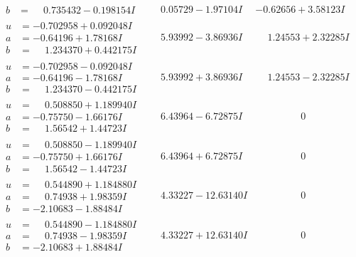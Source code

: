 \documentclass[1p]{elsarticle_modified}
\theoremstyle{definition}
\begin{document}
$$\begin{array}{c|c|c}
\begin{aligned}
b &= \phantom{-}0.735432 - 0.198154 I\end{aligned}
 & \phantom{-}0.05729 - 1.97104 I & -0.62656 + 3.58123 I \\ \hline\begin{aligned}
u &= -0.702958 + 0.092048 I \\
a &= -0.64196 + 1.78168 I \\
b &= \phantom{-}1.234370 + 0.442175 I\end{aligned}
 & \phantom{-}5.93992 - 3.86936 I & \phantom{-}1.24553 + 2.32285 I \\ \hline\begin{aligned}
u &= -0.702958 - 0.092048 I \\
a &= -0.64196 - 1.78168 I \\
b &= \phantom{-}1.234370 - 0.442175 I\end{aligned}
 & \phantom{-}5.93992 + 3.86936 I & \phantom{-}1.24553 - 2.32285 I \\ \hline\begin{aligned}
u &= \phantom{-}0.508850 + 1.189940 I \\
a &= -0.75750 - 1.66176 I \\
b &= \phantom{-}1.56542 + 1.44723 I\end{aligned}
 & \phantom{-}6.43964 - 6.72875 I & \phantom{-0.000000 } 0 \\ \hline\begin{aligned}
u &= \phantom{-}0.508850 - 1.189940 I \\
a &= -0.75750 + 1.66176 I \\
b &= \phantom{-}1.56542 - 1.44723 I\end{aligned}
 & \phantom{-}6.43964 + 6.72875 I & \phantom{-0.000000 } 0 \\ \hline\begin{aligned}
u &= \phantom{-}0.544890 + 1.184880 I \\
a &= \phantom{-}0.74938 + 1.98359 I \\
b &= -2.10683 - 1.88484 I\end{aligned}
 & \phantom{-}4.33227 - 12.63140 I & \phantom{-0.000000 } 0 \\ \hline\begin{aligned}
u &= \phantom{-}0.544890 - 1.184880 I \\
a &= \phantom{-}0.74938 - 1.98359 I \\
b &= -2.10683 + 1.88484 I\end{aligned}
 & \phantom{-}4.33227 + 12.63140 I & \phantom{-0.000000 } 0 \\ \hline\begin{aligned}

\end{aligned}
\end{array}$$
\end{document}
